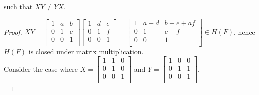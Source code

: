 \documentclass{article}
\begin{document}
\begin{enumerate}
\begin{enumerate}
\begin{enumerate}
            such that $XY\neq YX$.
            \begin{proof}
              $XY = \begin{bmatrix}
                  1 & a & b \\
                  0 & 1 & c \\
                  0 & 0 & 1 \\
                \end{bmatrix}
                \begin{bmatrix}
                  1 & d & e \\
                  0 & 1 & f \\
                  0 & 0 & 1 \\
                \end{bmatrix}
                =
                \begin{bmatrix}
                  1 & a+d & b+e+af \\
                  0 & 1   & c+f \\
                  0 & 0   & 1 \\
                \end{bmatrix} \in H(F)$, hence $H(F)$ is closed under
              matrix multiplication. \\

              Consider the case where $X =
                \begin{bmatrix}
                  1 & 1 & 0 \\
                  0 & 1 & 0 \\
                  0 & 0 & 1 \\
                \end{bmatrix}$
              and $Y =
                \begin{bmatrix}
                  1 & 0 & 0 \\
                  0 & 1 & 1 \\
                  0 & 0 & 1 \\
                \end{bmatrix}$. \\


\end{proof}
\end{enumerate}
\end{enumerate}
\end{enumerate}
\end{document}
